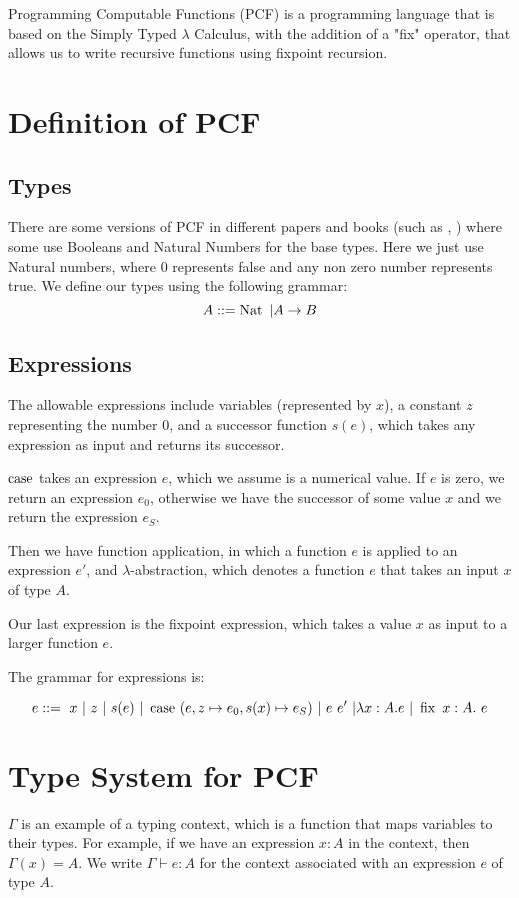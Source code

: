 Programming Computable Functions (PCF) is a programming language that is based on the Simply Typed $\lambda$ Calculus, with the addition of a "fix" operator, that allows us to write recursive functions using fixpoint recursion.

\section{Definition of PCF}

\subsection{Types}
There are some versions of PCF in different papers and books (such as \citep{Plotkin77}, \citep{Gunter92}) where some use Booleans and Natural Numbers for the base types. Here we just use Natural numbers, where $0$ represents false and any non zero number represents true. We define our types using the following grammar:\\

\[A ::= \operatorname{Nat} \ | A \to B\] 

\subsection{Expressions}

The allowable expressions include variables (represented by $x$), a constant $z$ representing the number $0$, and a successor function $s(e)$, which takes any expression as input and returns its successor. 

$\operatorname{case}$ takes an expression $e$, which we assume is a numerical value. If $e$ is zero, we return an expression $e_0$, otherwise we have the successor of some value $x$ and we return the expression $e_S$.

Then we have function application, in which a function $e$ is applied to an expression $e'$, and $\lambda$-abstraction, which denotes a function $e$ that takes an input $x$ of type $A$.

Our last expression is the fixpoint expression, which takes a value $x$ as input to a larger function $e$.

The grammar for expressions is:

\[e ::=  \ x \ | \ z \ | \ s(e) \  |  \ \case \ (e, z \mapsto e_0 , s(x) \mapsto e_S) \ |\ e \ e' \  | \lambda x:A.e \ | \ \fix \ x:A . \ e\]

\section{Type System for PCF}
$\Gamma$ is an example of a typing context, which is a function that maps variables to their types. For example, if we have an expression $x : A$ in the context, then $\Gamma(x) = A$. We write $\Gamma \vdash e : A$ for the context associated with an expression $e$ of type $A$.

